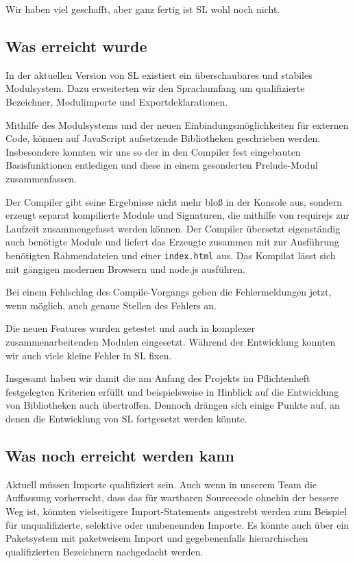 \documentclass[runningheads]{llncs}
\begin{document}
Wir haben viel geschafft, aber ganz fertig ist SL wohl noch nicht.

\subsection{Was erreicht wurde}

In der aktuellen Version von SL existiert ein überschaubares und stabiles
Modulsystem. Dazu erweiterten wir den Sprachumfang um qualifizierte Bezeichner,
Modulimporte und Exportdeklarationen.

Mithilfe des Modulsystems und der neuen Einbindungsmöglichkeiten für externen
Code, können auf JavaScript aufsetzende Bibliotheken geschrieben werden.
Insbesondere konnten wir uns so der in den Compiler fest eingebauten
Basisfunktionen entledigen und diese in einem gesonderten Prelude-Modul 
zusammenfassen.

Der Compiler gibt seine Ergebnisse nicht mehr bloß in der Konsole aus, sondern
erzeugt separat kompilierte Module und Signaturen, die mithilfe von requirejs
zur Laufzeit zusammengefasst werden können. Der Compiler übersetzt eigenständig
auch benötigte Module und liefert das Erzeugte zusammen mit zur Ausführung
benötigten Rahmendateien und einer \verb|index.html| aus. Das Kompilat lässt
sich mit gängigen modernen Browsern und node.js ausführen.

Bei einem Fehlschlag des Compile-Vorgangs geben die Fehlermeldungen jetzt,
wenn möglich, auch genaue Stellen des Fehlers an.

Die neuen Features wurden getestet und auch in komplexer zusammenarbeitenden
Modulen eingesetzt. Während der Entwicklung konnten wir auch viele kleine
Fehler in SL fixen.

Insgesamt haben wir damit die am Anfang des Projekts im Pflichtenheft
festgelegten Kriterien erfüllt und beispielsweise in Hinblick auf die
Entwicklung von Bibliotheken auch übertroffen. Dennoch drängen sich einige
Punkte auf, an denen die Entwicklung von SL fortgesetzt werden könnte.

\subsection{Was noch erreicht werden kann}

Aktuell müssen Importe qualifiziert sein. Auch wenn in unserem Team die
Auffassung vorherrscht, dass das für wartbaren Sourcecode ohnehin der
bessere Weg ist, könnten vielseitigere Import-Statements angestrebt werden
zum Beispiel für unqualifizierte, selektive oder umbenennden Importe.
Es könnte auch über ein Paketsystem mit paketweisem Import und gegebenenfalls
hierarchischen qualifizierten Bezeichnern nachgedacht werden.
\end{document}
